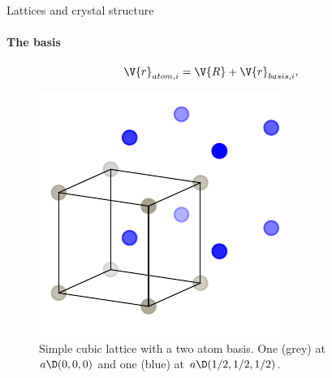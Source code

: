 \documentclass{beamer}
\begin{document}
\begin{frame}{Lattices and crystal structure}
\framesubtitle{The basis}
\pause
\begin{equation*}
	\V{r}_{atom,i} = \V{R} + \V{r}_{basis, i},
\end{equation*}
\pause
\begin{figure}[H]
	\centering
	\includegraphics[width=.35\linewidth]{figures/lattice_unfinished_1.pdf}
	\caption{Simple cubic lattice with a two atom basis. One (grey) at $ a \D (0,0,0) $ and one (blue) at $ a\D(1/2, 1/2, 1/2) $.}
\end{figure}
\end{frame}
\end{document}
